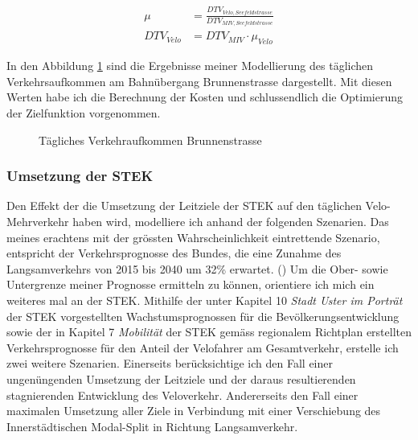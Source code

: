 \begin{align*}
\mu &= \frac{DTV_{Velo,Seefeldstrasse}}{DTV_{MIV,Seefeldstrasse}}   \\
DTV_{Velo} &= DTV_{MIV} \cdot \mu_{Velo} 
\end{align*}

In den Abbildung \ref{fig:DTV} sind die Ergebnisse meiner Modellierung des täglichen Verkehrsaufkommen am Bahnübergang Brunnenstrasse dargestellt. Mit diesen Werten habe ich die Berechnung der Kosten und schlussendlich die Optimierung der Zielfunktion vorgenommen.

\begin{figure}[h!]
  \centering
  \hfill
\caption[Verkehrsaufkommen]{Tägliches Verkehraufkommen Brunnenstrasse}
  \label{fig:DTV}
\end{figure}

\newpage


\subsubsection*{Umsetzung der STEK}
\label{subsubsec:Umsetzung}


Den Effekt der die Umsetzung der Leitziele der STEK auf den täglichen Velo-Mehrverkehr haben wird, modelliere ich anhand der folgenden Szenarien. Das meines erachtens mit der grössten Wahrscheinlichkeit eintrettende Szenario, entspricht der Verkehrsprognosse des Bundes, die eine Zunahme des Langsamverkehrs von 2015 bis 2040 um 32\% erwartet. (\cite{Perspektive2040}) 
Um die Ober- sowie Untergrenze meiner Prognosse ermitteln zu können, orientiere ich mich ein weiteres mal an der STEK. Mithilfe der unter Kapitel 10 \textit{Stadt Uster im Porträt} der STEK vorgestellten Wachstumsprognossen für die Bevölkerungsentwicklung sowie der in Kapitel 7 \textit{Mobilität} der STEK gemäss regionalem Richtplan erstellten Verkehrsprognosse für den Anteil der Velofahrer am Gesamtverkehr, erstelle ich zwei weitere Szenarien. 
Einerseits berücksichtige ich den Fall einer ungenüngenden Umsetzung der Leitziele und der daraus resultierenden stagnierenden Entwicklung des Veloverkehr. Andererseits den Fall einer maximalen Umsetzung aller Ziele in Verbindung mit einer Verschiebung des Innerstädtischen Modal-Split in Richtung Langsamverkehr.

